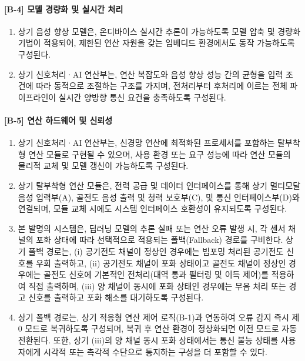 \documentclass{article}
\begin{document}
\paragraph{[B-4] 모델 경량화 및 실시간 처리}

\begin{enumerate}[label = \textbf{(B.4.\arabic*)}]

    \item 상기 음성 향상 모델은, 온디바이스 실시간 추론이 가능하도록
    모델 압축 및 경량화 기법이 적용되어, 제한된 연산 자원을 갖는
    임베디드 환경에서도 동작 가능하도록 구성된다.

    \item 상기 신호처리·AI 연산부는, 연산 복잡도와 음성 향상 성능 간의
    균형을 입력 조건에 따라 동적으로 조절하는 구조를 가지며, 전처리부터
    후처리에 이르는 전체 파이프라인이 실시간 양방향 통신 요건을 충족하도록
    구성된다.

\end{enumerate}


\paragraph{[B-5] 연산 하드웨어 및 신뢰성}

\begin{enumerate}[label = \textbf{(B.5.\arabic*)}]

    \item 상기 신호처리·AI 연산부는, 신경망 연산에 최적화된 프로세서를 포함하는 탈부착형 연산 모듈로 구현될 수 있으며, 사용 환경 또는 요구 성능에 따라 연산 모듈의 물리적 교체 및 모델 갱신이 가능하도록 구성된다.

    \item 상기 탈부착형 연산 모듈은, 전력 공급 및 데이터 인터페이스를 통해 상기 멀티모달 음성 입력부(A), 골전도 음성 출력 및 청력 보호부(C), 및 통신 인터페이스부(D)와 연결되며, 모듈 교체 시에도 시스템 인터페이스 호환성이 유지되도록 구성된다.

    \item 본 발명의 시스템은, 딥러닝 모델의 추론 실패 또는 연산 오류 발생 시, 각 센서 채널의 포화 상태에 따라 선택적으로 적용되는 폴백(Fallback) 경로를 구비한다. 상기 폴백 경로는, (i) 공기전도 채널이 정상인 경우에는 빔포밍 처리된 공기전도 신호를 우회 출력하고, (ii) 공기전도 채널이 포화 상태이고 골전도 채널이 정상인 경우에는 골전도 신호에 기본적인 전처리(대역 통과 필터링 및 이득 제어)를 적용하여 직접 출력하며, (iii) 양 채널이 동시에 포화 상태인 경우에는 무음 처리 또는 경고 신호를 출력하고 포화 해소를 대기하도록 구성된다.

    \item 상기 폴백 경로는, 상기 적응형 연산 제어 로직(B-1)과 연동하여 오류 감지 즉시 제0 모드로 복귀하도록 구성되며, 복귀 후 연산 환경이 정상화되면 이전 모드로 자동 전환된다. 또한, 상기 (iii)의 양 채널 동시 포화 상태에서는 통신 불능 상태를 사용자에게 시각적 또는 촉각적 수단으로 통지하는 구성을 더 포함할 수 있다.
\end{enumerate}
\end{document}
